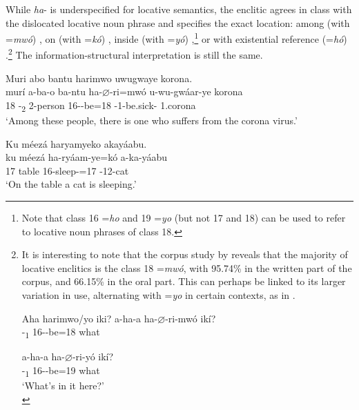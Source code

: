 \documentclass[output=paper]{langscibook}
\begin{document}
While \textit{ha}- is underspecified for locative semantics, the enclitic agrees in class with the dislocated locative noun phrase and specifies the exact location: among (with =\textit{mwó}) , on (with =\textit{kó}) , inside (with =\textit{yó}) ,\footnote{Note that class 16 =\textit{ho} and 19 =\textit{yo} (but not 17 and 18) can be used to refer to locative noun phrases of class 18.} or with existential reference (=\textit{hó}) .\footnote{It is interesting to note that the corpus study by \citet{NshemezimanaMberamihigo2021} reveals that the majority of locative enclitics is the class 18 =\textit{mwó}, with 95.74\% in the written part of the corpus, and 66.15\% in the oral part. This can perhaps be linked to its larger variation in use, alternating with =\textit{yo} in certain contexts, as in .

\ea 
Aha harimwo/yo iki?
\label{ex:kirundi:whatinhere}
  \ea
\gll
  {a-ha-a  ha-$\varnothing$-ri-mwó  ikí?}\\
    -\DEM{}\textsubscript{1}  16\SM-\PRS{}-be=18  what\\
\glt

  \ex
\gll
  {a-ha-a  ha-$\varnothing$-ri-yó  ikí?}\\
    -\DEM{}\textsubscript{1}  16\SM-\PRS{}-be=19  what\\
\glt
‘What’s in it here?’\\

  \z
  \zlast
} 
The information-structural interpretation is still the same.


\ea
\label{bkm:Ref80456712}
Muri abo bantu harimwo uwugwaye korona.\\
\gll
murí  a-ba-o  ba-ntu  ha-$\varnothing$-ri=mwó  u-wu-gwáar-ye  korona\\
18  -\DEM{}\textsubscript{2}  2-person  16\SM-\PRS{}-be=18  \AUG-{}1-be.sick-\PFV{}  1.corona\\
\glt
‘Among these people, there is one who suffers from the corona virus.’\\

\z

\ea
\label{bkm:Ref80456733}
Ku méezá haryamyeko akayáabu.\\
\gll
ku  méezá  ha-ryáam-ye=kó  a-ka-yáabu\\
17  table  16\SM{}-sleep-\PFV={}17  \AUG-{}12-cat\\
\glt
‘On the table a cat is sleeping.’\\
\end{document}

